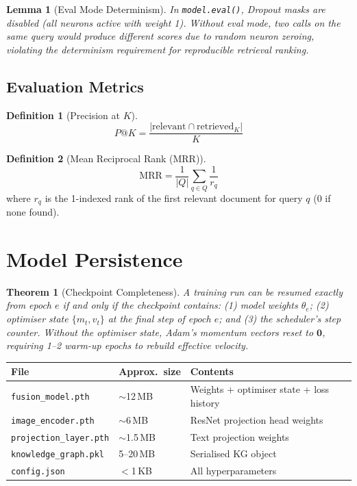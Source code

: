 \documentclass[12pt, a4paper]{article}
\theoremstyle{definition}
\newtheorem{definition}{Definition}[section]
\theoremstyle{plain}
\newtheorem{theorem}{Theorem}[section]
\newtheorem{lemma}{Lemma}[section]
\theoremstyle{remark}
\begin{document}
\begin{lemma}[Eval Mode Determinism]
In \texttt{model.eval()}, Dropout masks are disabled (all neurons active with
weight 1).  Without eval mode, two calls on the same query would produce
different scores due to random neuron zeroing, violating the determinism
requirement for reproducible retrieval ranking.
\end{lemma}

\subsection{Evaluation Metrics}

\begin{definition}[Precision at $K$]
\[
  P@K = \frac{|\text{relevant} \cap \text{retrieved}_K|}{K}
\]
\end{definition}

\begin{definition}[Mean Reciprocal Rank (MRR)]
\[
  \mathrm{MRR} = \frac{1}{|Q|}\sum_{q\in Q}\frac{1}{r_q}
\]
where $r_q$ is the 1-indexed rank of the first relevant document for query $q$
(0 if none found).
\end{definition}

\section{Model Persistence}
\label{sec:save}

\begin{theorem}[Checkpoint Completeness]
A training run can be resumed exactly from epoch $e$ if and only if the
checkpoint contains: (1) model weights $\theta_e$; (2) optimiser state
$\{m_t, v_t\}$ at the final step of epoch $e$; and (3) the scheduler's
step counter.  Without the optimiser state, Adam's momentum vectors reset
to $\mathbf{0}$, requiring 1--2 warm-up epochs to rebuild effective velocity.
\end{theorem}

\begin{center}
\renewcommand{\arraystretch}{1.15}
\begin{tabular}{@{}lll@{}}
\toprule
\textbf{File} & \textbf{Approx.\ size} & \textbf{Contents} \\
\midrule
\texttt{fusion\_model.pth}     & $\sim$12\,MB  & Weights + optimiser state + loss history \\
\texttt{image\_encoder.pth}    & $\sim$6\,MB   & ResNet projection head weights \\
\texttt{projection\_layer.pth} & $\sim$1.5\,MB & Text projection weights \\
\texttt{knowledge\_graph.pkl}  & 5--20\,MB     & Serialised KG object \\
\texttt{config.json}           & $<$1\,KB      & All hyperparameters \\
\bottomrule
\end{tabular}
\end{center}
\end{document}
